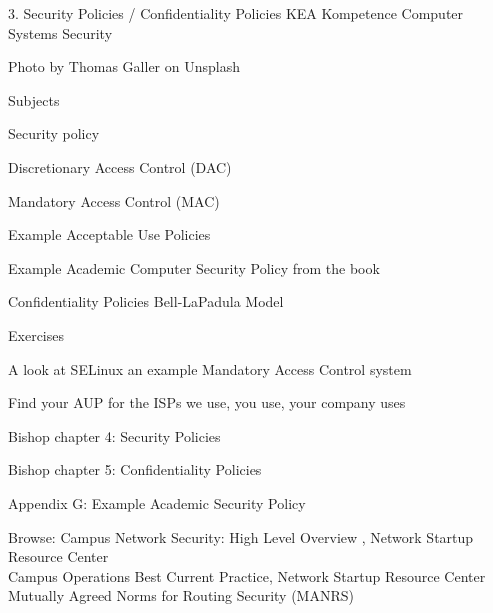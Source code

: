 \documentclass[Screen16to9,17pt]{foils}
\begin{document}
\mytitlepage
{3. Security Policies / Confidentiality Policies}
{KEA Kompetence Computer Systems Security \the\year}



 
\begin{list2}
\item
\end{list2}

{\small\hfill  Photo by Thomas Galler on Unsplash}
  

\begin{list1}
\item Subjects
\begin{list2}
  \item Security policy
  \item Discretionary Access Control (DAC)
  \item Mandatory Access Control (MAC)
  \item Example Acceptable Use Policies
  \item Example Academic Computer Security Policy from the book
  \item Confidentiality Policies Bell-LaPadula Model
\end{list2}
\item Exercises
\begin{list2}
\item A look at SELinux an example Mandatory Access Control system
\item Find your AUP for the ISPs we use, you use, your company uses
\end{list2}
\end{list1}


\begin{list1}
\item Bishop chapter 4: Security Policies
\item Bishop chapter 5: Confidentiality Policies
\item Appendix G: Example Academic Security Policy
\item Browse: Campus Network Security: High Level Overview , Network Startup Resource Center\\
Campus Operations Best Current Practice, Network Startup Resource Center\\
Mutually Agreed Norms for Routing Security (MANRS)
\end{list1}
\end{document}
